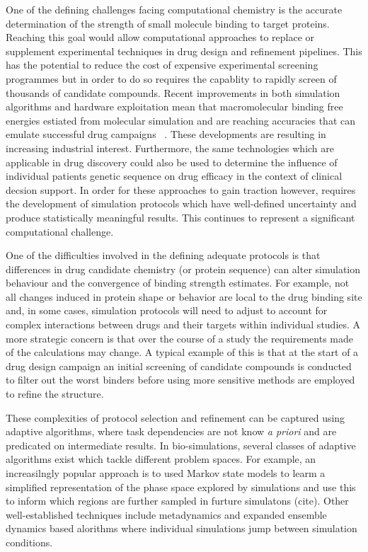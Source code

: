 One of the defining challenges facing computational chemistry is the accurate 
determination of the strength of small molecule binding to target proteins.
Reaching this goal would allow computational approaches to replace or supplement
experimental techniques in drug design and refinement pipelines.
This has the potential to reduce the cost of expensive experimental screening 
programmes but in order to do so requires the capablity to rapidly screen of 
thousands of candidate compounds. 
Recent improvements in both simulation algorithms and hardware exploitation 
mean that macromolecular binding free energies estiated from molecular simulation 
and are reaching accuracies that can emulate successful drug campaigns 
~\cite{DeVivo2016}.
These developments are resulting in increasing industrial interest.
Furthermore, the same technologies which are applicable in drug discovery 
could also be used to determine the influence of individual patients genetic 
sequence on drug efficacy in the context of clinical decsion support.
In order for these approaches to gain traction however, requires the development 
of simulation protocols which have well-defined uncertainty and 
produce statistically meaningful results.
This continues to represent a significant computational challenge. 

One of the difficulties involved in the defining adequate protocols is that 
differences in drug candidate chemistry (or protein sequence) can alter 
simulation behaviour and the convergence of binding strength estimates.
For example, not all changes induced in protein shape or behavior are local 
to the drug binding site and, in some cases, simulation protocols will need to 
adjust to account for complex interactions between drugs and their targets within 
individual studies.
A more strategic concern is that over the course of a study the requirements made of 
the calculations may change. 
A typical example of this is that at the start of a drug design campaign
an initial screening of candidate compounds is conducted to filter out the worst 
binders before using more sensitive methods are employed to refine the structure.

These complexities of protocol selection and refinement can be captured using 
adaptive algorithms, where task  dependencies are not know 
\textit{a priori} and are predicated on intermediate results. 
In bio-simulations, several classes of adaptive algorithms exist which tackle 
different problem spaces. 
For example, an increasilngly popular approach is to used Markov state models to 
learm a simplified representation of the phase space explored by simulations and
use this to inform which regions are further sampled in furture simulatons (cite). 
Other well-established techniques include metadynamics and expanded ensemble dynamics 
based alorithms where individual simulations jump between simulation conditions. 

